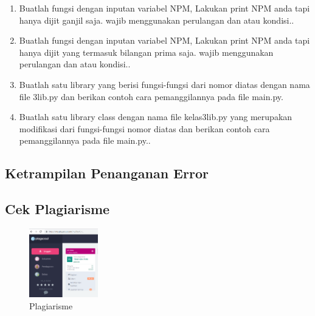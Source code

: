 \begin{enumerate}
\item Buatlah fungsi dengan inputan variabel NPM, Lakukan print NPM anda tapi hanya dijit ganjil saja. wajib menggunakan perulangan dan atau kondisi..
    

\item Buatlah fungsi dengan inputan variabel NPM, Lakukan print NPM anda tapi hanya dijit yang termasuk bilangan prima saja. wajib menggunakan perulangan dan atau kondisi..
    

\item Buatlah satu library yang berisi fungsi-fungsi dari nomor diatas dengan nama file 3lib.py dan berikan contoh cara pemanggilannya pada file main.py.
    

\item Buatlah satu library class dengan nama file kelas3lib.py yang merupakan modifikasi dari fungsi-fungsi nomor diatas dan berikan contoh cara pemanggilannya pada file main.py..
    

\end{enumerate}
\subsection{Ketrampilan Penanganan Error}
   
   
\subsection{Cek Plagiarisme}
\begin{figure}[!htbp]
	\centering
	\includegraphics[width=3cm,height=3cm]{figures/oni/plagiarisme.png}
	\caption{Plagiarisme}
	\label{plagiarisme}
\end{figure}